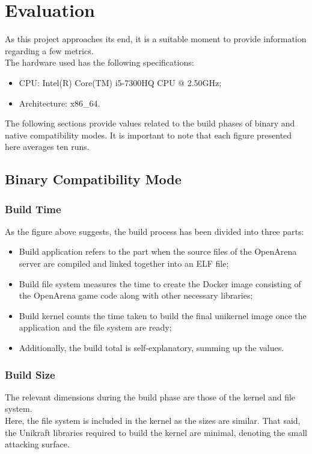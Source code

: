 \chapter{Evaluation}
As this project approaches its end, it is a suitable moment to provide information regarding a few metrics. \\
The hardware used has the following specifications:
\begin{itemize}
    \item CPU: Intel(R) Core(TM) i5-7300HQ CPU @ 2.50GHz;
    \item Architecture: x86_64.
\end{itemize}
The following sections provide values related to the build phases of binary and native compatibility modes.
It is important to note that each figure presented here averages ten runs.
\section{Binary Compatibility Mode}
\subsection{Build Time}
As the figure above suggests, the build process has been divided into three parts:
\begin{itemize}
    \item Build application refers to the part when the source files of the OpenArena server are compiled and linked together into an ELF file;
    \item Build file system measures the time to create the Docker image consisting of the OpenArena game code along with other necessary libraries;
    \item Build kernel counts the time taken to build the final unikernel image once the application and the file system are ready;
    \item Additionally, the build total is self-explanatory, summing up the values.    
\end{itemize}
\subsection{Build Size}
The relevant dimensions during the build phase are those of the kernel and file system. \\
Here, the file system is included in the kernel as the sizes are similar.\@
That said, the Unikraft libraries required to build the kernel are minimal, denoting the small attacking surface.

